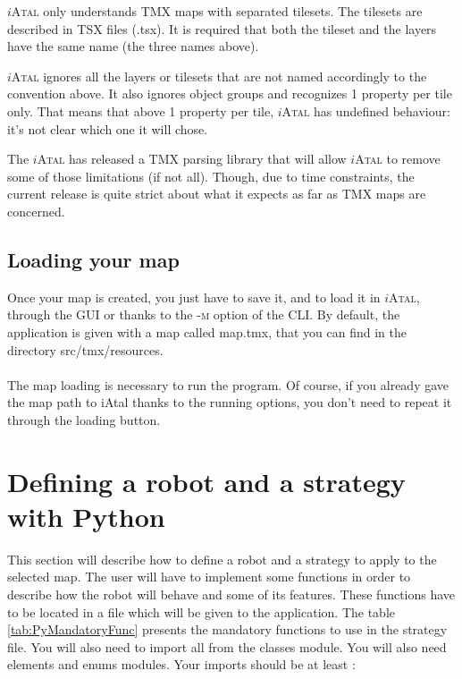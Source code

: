 \documentclass[a4paper,11pt]{article}
\newcommand\iAtal{$i$\textsc{Atal}}
\begin{document}
\iAtal{} only understands TMX maps with separated tilesets. The tilesets
are described in TSX files (.tsx). It is required that both the
tileset and the layers have the same name (the three names above).

\iAtal{} ignores all the layers or tilesets that are not named
accordingly to the convention above. It also ignores object groups and
recognizes 1 property per tile only. That means that above 1 property
per tile, \iAtal{} has undefined behaviour: it's not clear which one
it will chose.

The \iAtal{} has released a TMX parsing library that will allow
\iAtal{} to remove some of those limitations (if not all). Though, due
to time constraints, the current release is quite strict about what it
expects as far as TMX maps are concerned.

\subsection{Loading your map}

Once your map is created, you just have to save it, and to load it in
\iAtal{}, through the GUI or thanks to the \textsc{-m} option of the
CLI.
 By default,
the application is given with a map called map.tmx, that you can
find in the directory src/tmx/resources.

\paragraph{}
The map loading is necessary to run the program. Of course, if you
already gave the map path to iAtal thanks to the running options, %
you don't need to repeat it through the loading button.


\section{Defining a robot and a strategy with Python}

This section will describe how to define a robot and a strategy to
apply to the selected map. The user will have to implement some
functions in order to describe how the robot will behave and some of
its features. These functions have to be located in a file which will
be given to the application. The table \ref{tab:PyMandatoryFunc}
presents the mandatory functions to use in the strategy file. You will
also need to import all from the classes module. You will also need
elements and enums modules. Your imports should be at least :
\end{document}
